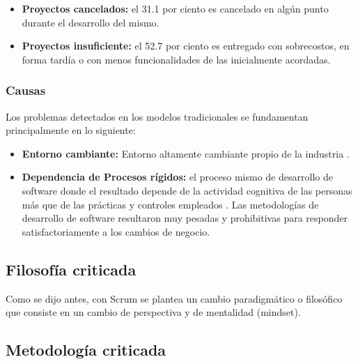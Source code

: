 \begin{itemize}

\item \textbf{Proyectos cancelados:} el 31.1 por ciento es cancelado en algún punto durante el desarrollo del mismo.
\item \textbf{Proyectos insuficiente:} el 52.7 por ciento es entregado con sobrecostos, en forma tardía o con menos funcionalidades de las inicialmente acordadas.


\end{itemize}

\subsubsection{Causas}

Los problemas detectados en los modelos tradicionales se fundamentan principalmente en lo siguiente: 

\begin{itemize}

\item \textbf{Entorno cambiante:} Entorno altamente cambiante propio de la industria \cite{Martin-Alaimo-2014}.

\item \textbf{Dependencia de Procesos rígidos:} el proceso mismo de desarrollo de software donde el resultado depende de la actividad
cognitiva de las personas más que de las prácticas y controles empleados \cite{Martin-Alaimo-2014}. Las metodologías de desarrollo de software resultaron muy pesadas y prohibitivas para responder satisfactoriamente a los cambios de negocio.

\end{itemize}

\subsection{Filosofía criticada}

Como se dijo antes, con Scrum se plantea un cambio paradigmático o filosófico que consiste en un cambio de perspectiva y de mentalidad (mindset).

\subsection{Metodología criticada}

